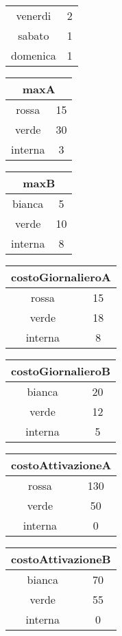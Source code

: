 \begin{center}
\begin{tabular}{| c | c |}
    venerdi & 2 \\
    sabato & 1 \\
    domenica & 1 \\
    \hline
\end{tabular}
\newline
\begin{tabular}{| c | c |}
    \hline
    \multicolumn{2}{|c|}{maxA}\\
    \hline \hline
    rossa & 15 \\
    verde & 30 \\
    interna & 3 \\
    \hline    
\end{tabular}
\begin{tabular}{| c | c |}
    \hline
    \multicolumn{2}{|c|}{maxB} \\
    \hline \hline
    bianca & 5 \\
    verde & 10 \\
    interna & 8 \\
    \hline    
\end{tabular}
\begin{tabular}{| c | c |}
    \hline
    \multicolumn{2}{|c|}{costoGiornalieroA}\\
    \hline \hline
    rossa & 15 \\
    verde & 18 \\
    interna & 8 \\
    \hline    
\end{tabular}
\begin{tabular}{| c | c |}
    \hline
    \multicolumn{2}{|c|}{costoGiornalieroB} \\
    \hline \hline
    bianca & 20 \\
    verde & 12 \\
    interna & 5 \\
    \hline    
\end{tabular}
\begin{tabular}{| c | c |}
    \hline
    \multicolumn{2}{|c|}{costoAttivazioneA}\\
    \hline \hline
    rossa & 130 \\
    verde & 50 \\
    interna & 0 \\
    \hline    
\end{tabular}
\begin{tabular}{| c | c |}
    \hline
    \multicolumn{2}{|c|}{costoAttivazioneB} \\
    \hline \hline
    bianca & 70 \\
    verde & 55 \\
    interna & 0 \\
    \hline    
\end{tabular}
\end{center}


